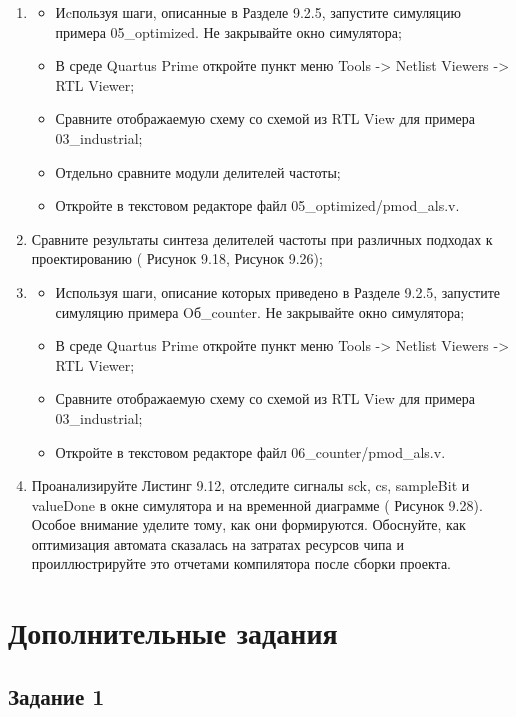\documentclass[a4paper,14pt]{article}
\begin{document}
\begin{enumerate}
		\item 
		\begin{itemize}
			\item Иcпользуя шаги, описанные в Разделе 9.2.5, запустите симуляцию примера 05\_optimized. Не закрывайте окно симулятора;
			\item В среде Quartus Prime откройте пункт меню Tools -> Netlist Viewers -> RTL Viewer;
			\item Сравните отображаемую схему со схемой из RТL View для примера 03\_industrial;
			\item Отдельно сравните модули делителей частоты;
			\item Откройте в текстовом редакторе файл 05\_optimized/pmod\_als.v.
		\end{itemize}
		
		\item Сравните результаты синтеза делителей частоты при различных подходах к проектированию ( Рисунок 9.18, Рисунок 9.26);
		
		
		\item 
		\begin{itemize}
			\item Используя шаги, описание которых приведено в Разделе 9.2.5, запустите симуляцию примера Oб\_counter. Не закрывайте окно симулятора;
			\item В среде Quartus Prime откройте пункт меню Tools -> Netlist Viewers -> RTL Viewer;
			\item Сравните отображаемую схему со схемой из RТL View для примера 03\_industrial;
			\item Откройте в текстовом редакторе файл 06\_counter/pmod\_als.v.
		\end{itemize}
	
		\item Проанализируйте Листинг 9.12, отследите сигналы sck, cs, sampleBit и valueDone в окне симулятора и на временной диаграмме ( Рисунок 9.28). Особое внимание уделите тому, как они формируются. Обоснуйте, как оптимизация автомата сказалась на затратах ресурсов чипа и проиллюстрируйте это отчетами компилятора после сборки проекта.
	\end{enumerate}
	
	\section{Дополнительные задания}
	
	\subsection{Задание 1}
	
\end{document}
